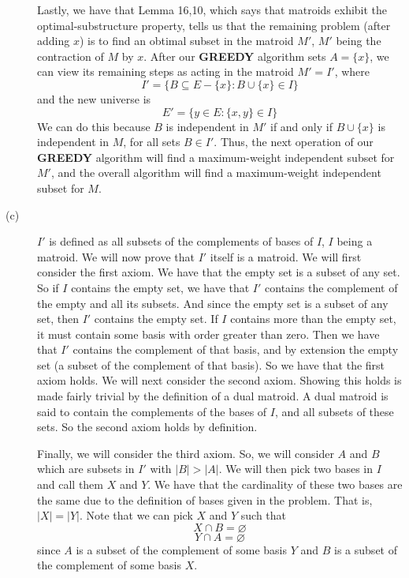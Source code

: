 \documentclass{article}
\begin{document}
\begin{description}
        Lastly, we
        have that Lemma 16,10, which says that matroids exhibit the
        optimal-substructure property, tells us that the remaining problem
        (after adding $x$) is to find an obtimal subset in the matroid $M'$,
        $M'$ being the contraction of $M$ by $x$. After our \textbf{GREEDY}
        algorithm sets $A = \{x\}$, we can view its remaining steps as acting in
        the matroid $M' = I'$, where
        \[ I' = \{ B \subseteq E - \{x\} : B \cup \{x\} \in I \} \]
        and the new universe is
        \[ E' = \{ y \in E : \{x,y\} \in I \} \]
        We can do this because $B$ is independent in $M'$ if and only if $B \cup
        \{x\}$ is independent in $M$, for all sets $B \in I'$. Thus, the next
        operation of our \textbf{GREEDY} algorithm will find a maximum-weight
        independent subset for $M'$, and the overall algorithm will find a
        maximum-weight independent subset for $M$.
    \item[(c)]
        $I'$ is defined as all subsets of the complements of bases of $I$, $I$
        being a matroid. We will now prove that $I'$ itself is a matroid. We
        will first consider the first axiom. We have that the empty set is a
        subset of any set. So if $I$ contains the empty set, we have that $I'$
        contains the complement of the empty and all its subsets. And since the
        empty set is a subset of any set, then $I'$ contains the empty set. If
        $I$ contains more than the empty set, it must contain some basis with
        order greater than zero. Then
        we have that $I'$ contains the complement of that basis, and by
        extension the empty set (a subset of the complement of that basis). So
        we have that the first axiom holds. We will next consider the second
        axiom. Showing this holds is made fairly trivial by the definition of a
        dual matroid. A dual matroid is said to contain the complements of the
        bases of $I$, and all subsets of these sets. So the second axiom holds
        by definition.

        Finally, we will consider the third axiom. So, we will consider $A$ and
        $B$ which are subsets in $I'$ with $|B| > |A|$. We will then pick two
        bases in $I$ and call them $X$ and $Y$. We have that the cardinality of
        these two bases are the same due to the definition of bases given in the
        problem. That is, $|X| = |Y|$. Note that we can pick $X$ and $Y$ such
        that
        \[ X \cap B = \varnothing \]
        \[ Y \cap A = \varnothing \]
        since $A$ is a subset of the complement of some basis $Y$ and
        $B$ is a subset of the complement of some basis $X$.


\end{description}
\end{document}
